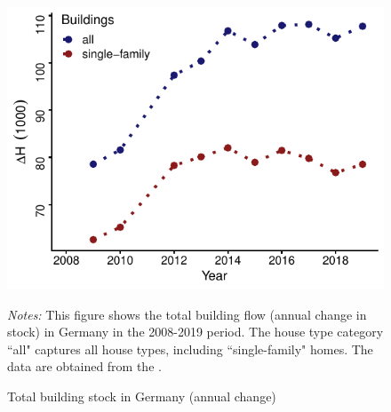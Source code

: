\documentclass[
  12pt,
]{article}
\begin{document}
\begin{figure}[H]
\centering

\begin{center}\includegraphics{output/figs/quantity-growth-1} \end{center}

\caption{Total building stock in Germany (annual change)}
\medskip
\begin{minipage}{0.9\textwidth}
\footnotesize
\textit{Notes:} This figure shows the total building flow (annual change in stock) in Germany in the 2008-2019 period. The house type category ``all" captures all house types, including ``single-family" homes. The data are obtained from the \citet{atlasde2022}. 
\end{minipage}
\end{figure}
\end{document}
